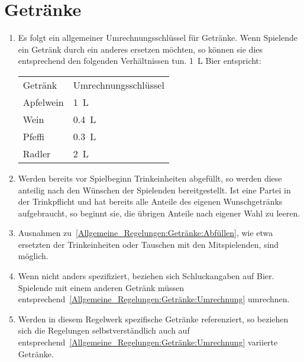 \section{Getränke}\label{Allgemeine_Regelungen:Getränke}
\begin{enumerate}[label={(\arabic*)}]
	\item\label{Allgemeine_Regelungen:Getränke:Umrechnung}
	Es folgt ein allgemeiner Umrechnungsschlüssel für Getränke.
	Wenn Spielende ein Getränk durch ein anderes ersetzen möchten, so können sie dies entsprechend den folgenden Verhältnissen tun.
	\SI{1}{\liter} Bier entspricht:
	\begin{tabular}{ll}
		\toprule
		Getränk   & Umrechnungsschlüssel \\
		Apfelwein & \SI{1}{\liter} \\
		Wein 	  & \SI{0,4}{\liter} \\
		Pfeffi 	  & \SI{0,3}{\liter} \\
		Radler    & \SI{2}{\liter} \\\bottomrule
	\end{tabular}
	
	\item\label{Allgemeine_Regelungen:Getränke:Abfüllen}
	Werden bereits vor Spielbeginn Trinkeinheiten abgefüllt, so werden diese anteilig nach den Wünschen der Spielenden bereitgestellt.
	Ist eine Partei in der Trinkpflicht und hat bereits alle Anteile des eigenen Wunschgetränks aufgebraucht, so beginnt sie, die übrigen Anteile nach eigener Wahl zu leeren.
	
	\item
	Ausnahmen zu~\ref{Allgemeine_Regelungen:Getränke:Abfüllen}, wie etwa ersetzten der Trinkeinheiten oder Tauschen mit den Mitspielenden, sind möglich.
	
	\item
	Wenn nicht anders spezifiziert, beziehen sich Schluckangaben auf Bier.
	Spielende mit einem anderen Getränk müssen entsprechend~\ref{Allgemeine_Regelungen:Getränke:Umrechnung} umrechnen.

	\item
	Werden in diesem Regelwerk spezifische Getränke referenziert, so beziehen sich die Regelungen selbstverständlich auch auf entsprechend~\ref{Allgemeine_Regelungen:Getränke:Umrechnung} variierte Getränke.
\end{enumerate}
